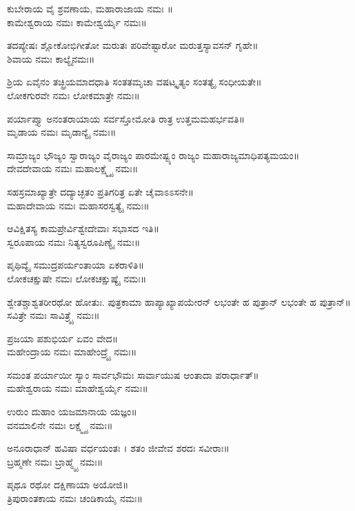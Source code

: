 ಕುಬೇರಾಯ ವೈ ಶ್ರವಣಾಯ, ಮಹಾರಾಜಾಯ ನಮಃ ॥\\ಕಾಮೇಶ್ವರಾಯ ನಮಃ ಕಾಮೇಶ್ವರ್ಯೈ ನಮಃ॥

ತದಪ್ಯೇಷಃ ಶ್ಲೋಕೋಭಿಗೀತೋ ಮರುತಃ ಪರಿವೇಷ್ಟಾರೋ ಮರುತ್ತಸ್ಯಾವಸನ್ ಗೃಹೇ॥\\ಶಿವಾಯ ನಮಃ ಕಾಲ್ಯೈನಮಃ॥

 ಶ್ರಿಯ ಏವೈನಂ ತಚ್ಛ್ರಿಯಮಾದಧಾತಿ ಸಂತತಮೃಚಾ ವಷಟ್ಕೃತ್ಯಂ ಸಂತತ್ಯೈ ಸಂಧೀಯತೇ॥\\ ಲೋಕಗುರವೇ ನಮಃ  ಲೋಕಮಾತ್ರೇ ನಮಃ॥

ಪರ್ಯಾಪ್ತ್ಯಾ ಅನಂತರಾಯಾಯ ಸರ್ವಸ್ತೋಮೋತಿ ರಾತ್ರ ಉತ್ತಮಮಹರ್ಭವತಿ॥\\ಮೃಡಾಯ ನಮಃ ಮೃಡಾನ್ಯೈ ನಮಃ॥

ಸಾಮ್ರಾಜ್ಯಂ ಭೌಜ್ಯಂ ಸ್ವಾರಾಜ್ಯಂ ವೈರಾಜ್ಯಂ ಪಾರಮೇಷ್ಟ್ಯಂ ರಾಜ್ಯಂ ಮಹಾರಾಜ್ಯಮಾಧಿಪತ್ಯಮಯಂ॥\\ದೇವದೇವಾಯ ನಮಃ  ಮಹಾಲಕ್ಷ್ಮ್ಯೈ ನಮಃ॥

ಸಹಸ್ರಮಾಖ್ಯಾತ್ರೇ ದದ್ಯಾಚ್ಛತಂ ಪ್ರತಿಗರಿತ್ರ ಏತೇ ಚೈವಾಽಽಸನೇ॥\\ಮಹಾದೇವಾಯ ನಮಃ ಮಹಾಸರಸ್ವತ್ಯೈ ನಮಃ॥

ಆವಿಕ್ಷಿತಸ್ಯ ಕಾಮಪ್ರೇರ್ವಿಶ್ವೇದೇವಾಃ ಸಭಾಸದ ಇತಿ॥\\ಸ್ವರೂಪಾಯ ನಮಃ ನಿತ್ಯಸ್ವರೂಪಿಣ್ಯೈ ನಮಃ॥

ಪೃಥಿವ್ಯೈ ಸಮುದ್ರಪರ್ಯಂತಾಯಾ ಏಕರಾಳಿತಿ॥\\ಲೋಕಚಕ್ಷುಷೇ ನಮಃ ಲೋಕಚಕ್ಷುಷ್ಯೈ ನಮಃ॥

ಶ್ವೇತಶ್ಚಾಶ್ವತರೀರಥೋ ಹೋತುಃ. ಪುತ್ರಕಾಮಾ ಹಾಪ್ಯಾಖ್ಯಾಪಯೇರನ್ ಲಭಂತೇ ಹ ಪುತ್ರಾನ್ ಲಭಂತೇ ಹ ಪುತ್ರಾನ್॥\\ಸವಿತ್ರೇ ನಮಃ ಸಾವಿತ್ರ್ಯೈ ನಮಃ॥

ಪ್ರಜಯಾ ಪಶುಭಿರ್ಯ ಏವಂ ವೇದ॥\\ಮಹೇಂದ್ರಾಯ ನಮಃ ಮಾಹೇಂದ್ರ್ಯೈ ನಮಃ॥

ಸಮಂತ ಪರ್ಯಾಯೀ ಸ್ಯಾಂ ಸಾರ್ವಭೌಮಃ ಸಾರ್ವಾಯುಷ ಆಂತಾದಾ ಪರಾರ್ಧಾತ್॥\\ಮಹೇಶ್ವರಾಯ ನಮಃ ಮಾಹೇಶ್ವರ್ಯೈ ನಮಃ॥

ಉರುಂ ದುಹಾಂ ಯಜಮಾನಾಯ ಯಜ್ಞಂ॥\\ವನಮಾಲಿನೇ ನಮಃ ಲಕ್ಷ್ಮ್ಯೈ ನಮಃ॥

ಅನೂರಾಧಾನ್ ಹವಿಷಾ ವರ್ಧಯಂತಃ । ಶತಂ ಜೀವೇವ ಶರದಃ ಸವೀರಾಃ॥\\ಬ್ರಹ್ಮಣೇ ನಮಃ ಬ್ರಾಹ್ಮ್ಯೈ ನಮಃ॥

ಪೃಥೂ ರಥೋ ದಕ್ಷಿಣಾಯಾ ಅಯೋಜಿ॥\\ತ್ರಿಪುರಾಂತಕಾಯ ನಮಃ ಚಂಡಿಕಾಯೈ ನಮಃ॥

